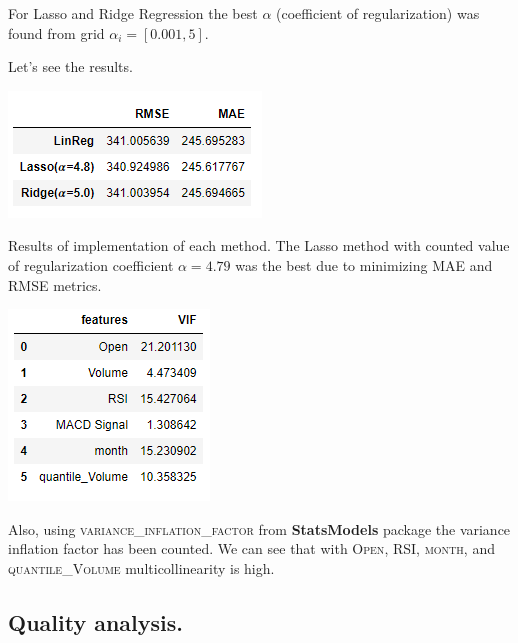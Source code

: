 \documentclass[%
12pt, %
final, %
oneside, %
onecolumn, %
centertags]{article} %
\theoremstyle{plain}
\theoremstyle{definition}
\theoremstyle{remark}
\begin{document}
For Lasso and Ridge Regression the best $\alpha$ (coefficient of regularization) was found from grid $\alpha_i = [0.001, 5]$. 

Let's see the results.

\begin{center}
\includegraphics[scale=0.8]{images/results_reg.png}

Results of implementation of each method. The Lasso method with counted value of regularization coefficient $\alpha=4.79$ was the best due to minimizing \textsc{MAE} and \textsc{RMSE} metrics.
\end{center}

\begin{center}
\includegraphics[scale=0.9]{images/vif_data.png}

Also, using \textsc{variance\_inflation\_factor} from \textbf{StatsModels} package the variance inflation factor has been counted. We can see that with \textsc{Open}, \textsc{RSI}, \textsc{month}, and \textsc{quantile\_Volume} multicollinearity is high.
\end{center}

\subsection{Quality analysis.}
\end{document}
